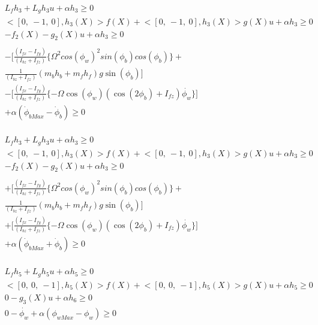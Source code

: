 \documentclass[journal, onecolumn]{IEEEtran} %
\begin{document}
\begin{equation}
    \begin{aligned}
        &L_fh_3 + L_g h_3 u + \alpha h_3 \geq 0 \\
        &\Big< [0,\ -1,\ 0], h_3(X)\Big> f(X) + \Big< [0,\ -1,\ 0], h_3(X)\Big> g(X)u + \alpha h_3 \geq 0 \\
        &-f_2(X) - g_2(X)u + \alpha h_3 \geq 0 \\ \\ 
        & - \Bigg[
        \frac{ (I_{fx} - I_{fy}) }{(I_{bz} + I_{fz})} 
        \{ {\Omega}^2 {cos(\phi_w)}^2 sin(\phi_b) cos(\phi_b) \} + \\
        &\frac{ 1 }{(I_{bz} + I_{fz})} (m_b h_b + m_f h_f) g \sin(\phi_b) 
        \Bigg] \\
        & - \Bigg[
        \frac{ (I_{fx} - I_{fy}) }{(I_{bz} + I_{fz})} 
        \{ -\Omega \cos(\phi_w)(\cos(2\phi_b) + I_{fz})\dot{\phi_w} \} 
        \Bigg]\\
        &+ \alpha (\dot{\phi}_{bMax} - \dot{\phi}_b) \geq 0 \\
    \end{aligned}
\end{equation}

\begin{equation}
    \begin{aligned}
        &L_fh_3 + L_g h_3 u + \alpha h_3 \geq 0 \\
        &\Big< [0,\ -1,\ 0], h_3(X)\Big> f(X) + \Big< [0,\ -1,\ 0], h_3(X)\Big> g(X)u + \alpha h_3 \geq 0 \\
        &-f_2(X) - g_2(X)u + \alpha h_3 \geq 0 \\ \\ 
        & + \Bigg[
        \frac{ (I_{fx} - I_{fy}) }{(I_{bz} + I_{fz})} 
        \{ {\Omega}^2 {cos(\phi_w)}^2 sin(\phi_b) cos(\phi_b) \} + \\
        &\frac{ 1 }{(I_{bz} + I_{fz})} (m_b h_b + m_f h_f) g \sin(\phi_b) 
        \Bigg] \\
        & + \Bigg[
        \frac{ (I_{fx} - I_{fy}) }{(I_{bz} + I_{fz})} 
        \{ -\Omega \cos(\phi_w)(\cos(2\phi_b) + I_{fz})\dot{\phi_w} \} 
        \Bigg]\\
        &+ \alpha (\dot{\phi}_{bMax} + \dot{\phi}_b) \geq 0 \\
    \end{aligned}
\end{equation}

\begin{equation}
    \begin{aligned}
        &L_fh_5 + L_g h_5 u + \alpha h_5 \geq 0 \\
        &\Big< [0,\ 0,\ -1], h_5(X)\Big> f(X) + \Big< [0,\ 0,\ -1], h_5(X)\Big> g(X)u + \alpha h_5 \geq 0 \\
        &0 - g_3(X)u + \alpha h_6 \geq 0 \\
        &0 -\dot{\phi_w} + \alpha (\phi_{wMax} - \phi_w) \geq 0 \\
    \end{aligned}
\end{equation}
\end{document}
